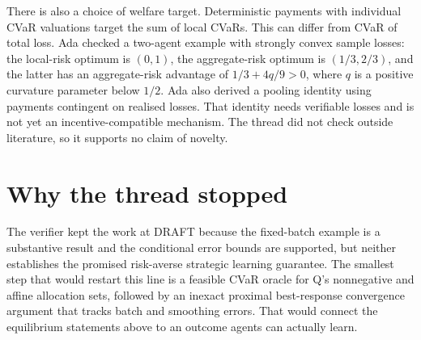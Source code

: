 \documentclass{article}
\begin{document}
There is also a choice of welfare target. Deterministic payments with individual CVaR valuations target the
sum of local CVaRs. This can differ from CVaR of total loss. Ada checked a two-agent example with strongly
convex sample losses: the local-risk optimum is \((0,1)\), the aggregate-risk optimum is \((1/3,2/3)\), and
the latter has an aggregate-risk advantage of \(1/3+4q/9>0\), where \(q\) is a positive curvature parameter
below \(1/2\). Ada also derived a pooling identity using payments contingent on realised losses. That
identity needs verifiable losses and is not yet an incentive-compatible mechanism. The thread did not check
outside literature, so it supports no claim of novelty.

\section{Why the thread stopped}

The verifier kept the work at DRAFT because the fixed-batch example is a substantive result and the
conditional error bounds are supported, but neither establishes the promised risk-averse strategic learning
guarantee. The smallest step that would restart this line is a feasible CVaR oracle for Q's nonnegative and
affine allocation sets, followed by an inexact proximal best-response convergence argument that tracks batch
and smoothing errors. That would connect the equilibrium statements above to an outcome agents can actually
learn.



\end{document}
